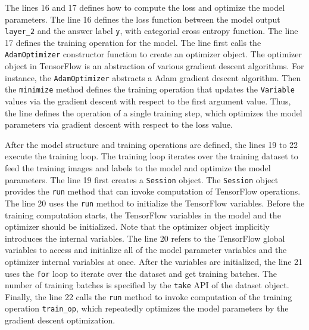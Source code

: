 The lines 16 and 17 defines how to compute the loss and optimize the model
parameters.
The line 16 defines the loss function between the model output {\tt layer\_2} 
and the answer label {\tt y}, with categorial cross entropy function.
The line 17 defines the training operation for the model.
The line first calls the {\tt AdamOptimizer} constructor
function to create an optimizer object.
The optimizer object in TensorFlow is an abstraction of various gradient
descent algorithms.
For instance, the {\tt AdamOptimizer} abstracts a Adam gradient descent
algorithm. %
Then the {\tt minimize} method defines the training operation that updates the
{\tt Variable} values via the gradient descent with respect
to the first argument value.
Thus, the line defines the operation of a single training step,
which optimizes the model parameters via gradient descent with respect to
the loss value.

After the model structure and training operations are defined, 
the lines 19 to 22 execute the training loop.
The training loop iterates over the training dataset to feed the training
images and labels to the model and optimize the model parameters. 
The line 19 first creates a {\tt Session} object.
The {\tt Session} object provides the {\tt run} method that can invoke
computation of TensorFlow operations.
The line 20 uses the {\tt run} method to initialize the TensorFlow variables.
Before the training computation starts,
the TensorFlow variables in the model and the optimizer should be initialized.
Note that the optimizer object implicitly introduces the internal variables.
The line 20 refers to the TensorFlow global variables to access and initialize
all of the model parameter variables and the optimizer internal variables
at once.
After the variables are initialized, the line 21 uses the {\tt for} loop
to iterate over the dataset and get training batches. 
The number of training batches is specified by the {\tt take} API of the
dataset object.
Finally, the line 22 calls the {\tt run} method to
invoke computation of the training operation {\tt train\_op},
which repeatedly optimizes the model parameters by the gradient descent
optimization.


